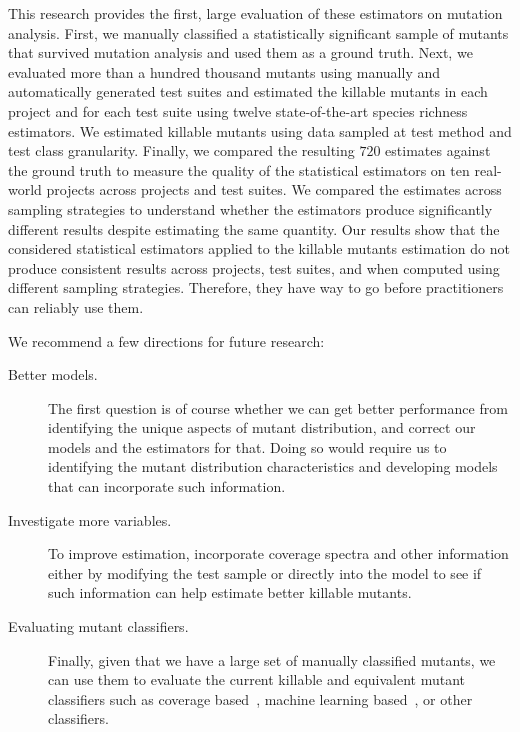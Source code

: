 \documentclass[sigconf,review,anonymous]{acmart}
\newcommand{\estimatorCount}{twelve\xspace}
\newcounter{todocounter}
\newcommand{\todo}[1]{\marginpar{$|$}\textcolor{red}{\stepcounter{todocounter}\footnote[\thetodocounter]{\textcolor{red}{\textbf{TODO }}\textit{#1}}}}
\renewcommand{\todo}[1]{}
\begin{document}
This research provides the first, large evaluation of these estimators on mutation analysis. 
%
First, we manually classified a statistically significant sample of mutants that survived mutation analysis
and used them as a ground truth.
%
Next, we evaluated more than a hundred thousand mutants
using manually and automatically generated test suites and
estimated the killable mutants in each project and for each test suite
using \estimatorCount state-of-the-art species richness estimators.
We estimated killable mutants using data sampled at test method
and test class granularity.
%
Finally, we compared the resulting $720$ estimates against the ground truth
 to measure the quality of the statistical estimators on ten real-world projects
 across projects and test suites.
 We compared the estimates across sampling strategies to understand
 whether the estimators produce %
 significantly different results despite estimating the same quantity. %
%
Our results show that the considered statistical estimators %
applied to the killable mutants estimation do not produce consistent results across
projects, test suites, and when computed using different sampling strategies.
Therefore, they have way to go before practitioners can reliably use them.


We recommend a few directions for future research:

\begin{description}
\item[Better models.] The first question is of course whether we can get better
performance from identifying the unique aspects of mutant distribution, and
correct our models and the estimators for that. 
%
Doing so would require us to identifying the mutant distribution characteristics
and developing models that can incorporate such information. 

\item[Investigate more variables.] To improve estimation, incorporate
 coverage spectra and other information either by modifying the test sample
or directly into the model to see if such information can help estimate better
killable mutants.

\item[Evaluating mutant classifiers.] Finally, given that we have a large set
of manually classified mutants, we can use them to evaluate the current
killable and equivalent mutant classifiers such as coverage
based~\cite{schuler2013covering}, machine learning
based~\cite{peacock2021automatic,naem2020a}, or
other~\cite{papadakis2013mutation} classifiers.


\end{description}
\end{document}
